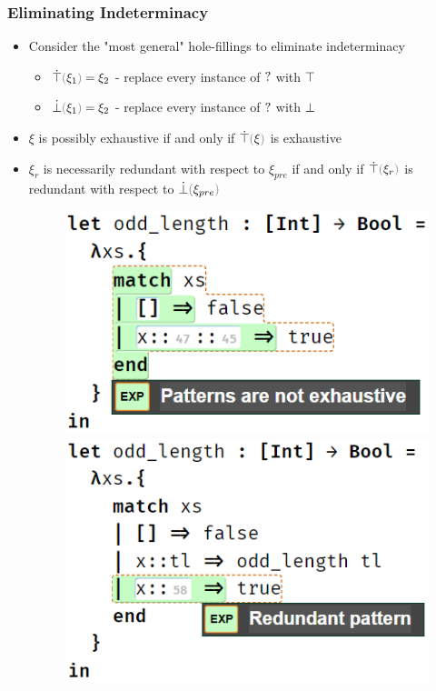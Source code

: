 \documentclass{beamer}
\begin{document}
\begin{frame}
\frametitle{Eliminating Indeterminacy}
\begin{itemize}
\item Consider the "most general" hole-fillings to eliminate indeterminacy
\begin{itemize}
	\item $\ctruify{\xi_1} = \xi_2$ - replace every instance of $\mathtt{?}$ with $\top$
	\item $\cfalsify{\xi_1} = \xi_2$ - replace every instance of $\mathtt{?}$ with $\bot$
\end{itemize}

\medskip
\item $\xi$ is possibly exhaustive if and only if $\ctruify{\xi}$ is exhaustive
\medskip
\item $\xi_r$ is necessarily redundant with respect to $\xi_{pre}$ if and only if $\ctruify{\xi_r}$ is redundant with respect to $\cfalsify{\xi_{pre}}$

\begin{figure}
	\centering
	\includegraphics[scale=0.5]{imgs/not_exhaustive.png}
	\hfil
	\includegraphics[scale=0.5]{imgs/redundant.png}
\end{figure}
\end{itemize}
\end{frame}
\end{document}
